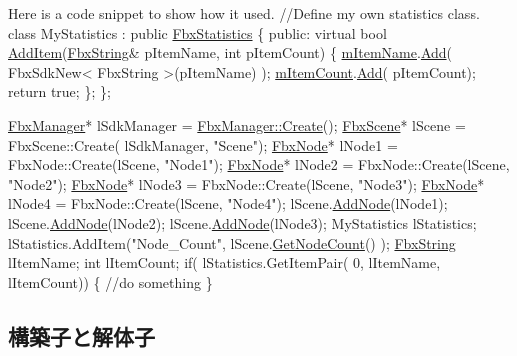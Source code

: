 \begin{DoxyCode}
 Here is a code snippet to show how it used.
\textcolor{comment}{//Define my own statistics class.}
class MyStatistics : \textcolor{keyword}{public} \hyperlink{class_fbx_statistics}{FbxStatistics}
\{
 \textcolor{keyword}{public}:
    \textcolor{keyword}{virtual} \textcolor{keywordtype}{bool} \hyperlink{class_fbx_statistics_abd81e5b31d33546ad6ba5fa9af34c792}{AddItem}(\hyperlink{class_fbx_string}{FbxString}& pItemName, \textcolor{keywordtype}{int} pItemCount)
    \{
        \hyperlink{class_fbx_statistics_a91d987cd85cf3e567b9c309c9389f02d}{mItemName}.\hyperlink{class_fbx_array_aad977e99a3924f6cd758f90c26435d21}{Add}( FbxSdkNew< FbxString >(pItemName) );
        \hyperlink{class_fbx_statistics_a9754af27b7b5d98fb085595e633370e8}{mItemCount}.\hyperlink{class_fbx_array_aad977e99a3924f6cd758f90c26435d21}{Add}( pItemCount);
        \textcolor{keywordflow}{return} \textcolor{keyword}{true};
    \};
\};

\hyperlink{class_fbx_manager}{FbxManager}* lSdkManager = \hyperlink{class_fbx_manager_af51cafc0f34f17d497f7921d847a4dd4}{FbxManager::Create}(); 
\hyperlink{class_fbx_scene}{FbxScene}*      lScene      = FbxScene::Create( lSdkManager, \textcolor{stringliteral}{"Scene"});
\hyperlink{class_fbx_node}{FbxNode}*       lNode1      = FbxNode::Create(lScene, \textcolor{stringliteral}{"Node1"});
\hyperlink{class_fbx_node}{FbxNode}*       lNode2      = FbxNode::Create(lScene, \textcolor{stringliteral}{"Node2"});
\hyperlink{class_fbx_node}{FbxNode}*       lNode3      = FbxNode::Create(lScene, \textcolor{stringliteral}{"Node3"});
\hyperlink{class_fbx_node}{FbxNode}*       lNode4      = FbxNode::Create(lScene, \textcolor{stringliteral}{"Node4"});
lScene.\hyperlink{class_fbx_scene_a4da84de06d868fd3542f4688834dff6d}{AddNode}(lNode1);
lScene.\hyperlink{class_fbx_scene_a4da84de06d868fd3542f4688834dff6d}{AddNode}(lNode2);
lScene.\hyperlink{class_fbx_scene_a4da84de06d868fd3542f4688834dff6d}{AddNode}(lNode3);
MyStatistics lStatistics;
lStatistics.AddItem(\textcolor{stringliteral}{"Node\_Count"}, lScene.\hyperlink{class_fbx_scene_a0cb1a1464b0fa1b8291c41900879515e}{GetNodeCount}() );
\hyperlink{class_fbx_string}{FbxString} lItemName;
\textcolor{keywordtype}{int}     lItemCount;
\textcolor{keywordflow}{if}( lStatistics.GetItemPair( 0, lItemName, lItemCount))
\{
    \textcolor{comment}{//do something}
\}
\end{DoxyCode}
 

\subsection{構築子と解体子}
\mbox{\label{class_fbx_statistics_a0eeeff235df61aa34125ff7bb846a05d}} 
